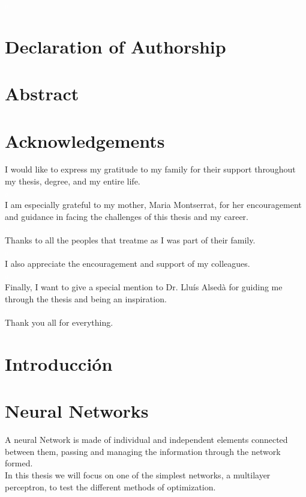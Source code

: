 \documentclass[a4paper, 11pt]{article}
\begin{document}
\justifying
\newpage
\textcolor{white}{a}
\newpage 

\section*{Declaration of Authorship}
\newpage
\section*{Abstract}
\newpage
\section*{Acknowledgements}
I would like to express my gratitude to my family for their support throughout my thesis, degree, and my entire life.\\
\textcolor{white}{a}\\
I am especially grateful to my mother, Maria Montserrat, for her encouragement and guidance in facing the challenges of this thesis and my career.\\
\textcolor{white}{a}\\
Thanks to all the peoples that treatme as I was part of their family.\\
\textcolor{white}{a}\\
I also appreciate the encouragement and support of my colleagues.\\
\textcolor{white}{a}\\
Finally, I want to give a special mention to Dr. Lluís Alsedà for guiding me through the thesis and being an inspiration.\\
\textcolor{white}{a}\\
Thank you all for everything. 
\newpage

\tableofcontents
\listoffigures
\listoftables


\newpage \pagestyle{extended_plain}
\setcounter{page}{2}
\section*{Introducción}
\newpage

\newpage
\section{Neural Networks} 
A neural Network is made of individual and independent elements connected between them, passing and managing the information through the network formed.\\
In this thesis we will focus on one of the simplest networks, a multilayer perceptron, to test the different methods of optimization.
\end{document}
